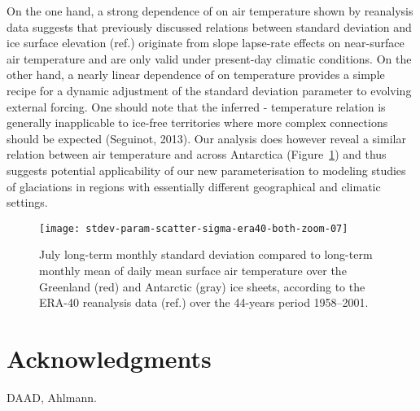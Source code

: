 \documentclass[review]{igs}
\begin{document}
On the one hand, a strong dependence of  on air temperature shown by reanalysis data suggests that previously discussed relations between standard deviation and ice surface elevation (ref.) originate from slope lapse-rate effects on near-surface air temperature and are only valid under present-day climatic conditions. On the other hand, a nearly linear dependence of  on temperature provides a simple recipe for a dynamic adjustment of the standard deviation parameter to evolving external forcing. One should note that the inferred  - temperature relation is generally inapplicable to ice-free territories where more complex connections should be expected (Seguinot, 2013). Our analysis does however reveal a similar relation between air temperature and  across Antarctica (Figure~\ref{fig:both}) and thus suggests potential applicability of our new parameterisation to modeling studies of glaciations in regions with essentially different geographical and climatic settings.

\begin{figure}
    \centering\texttt{[image: stdev-param-scatter-sigma-era40-both-zoom-07]}
    \caption{July long-term monthly standard deviation compared to long-term monthly mean of daily mean surface air temperature over the Greenland (red) and Antarctic (gray) ice sheets, according to the ERA-40 reanalysis data (ref.) over the 44-years period 1958–2001.}
    \label{fig:both}
\end{figure}


\section{Acknowledgments}

DAAD, Ahlmann.



\end{document}
